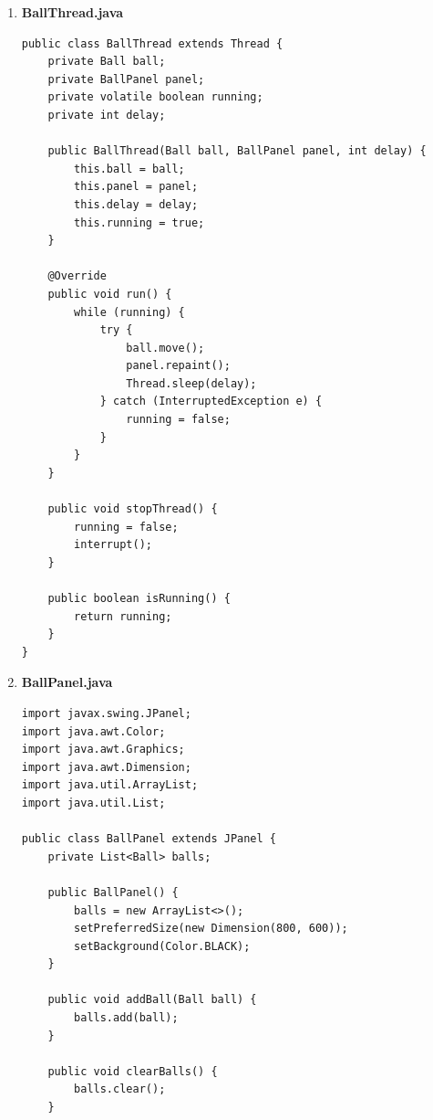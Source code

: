 \documentclass[a4paper]{article}
\begin{document}
\begin{enumerate}[itemsep=1em]
\begin{enumerate}[itemsep=1em]
\begin{verbatim}
        if (y - radius < 0 || y + radius > panelHeight) {
            dy = -dy;
            if (y - radius < 0) y = radius;
            if (y + radius > panelHeight) 
                y = panelHeight - radius;
        }
    }

    public void draw(Graphics g) {
        g.setColor(color);
        g.fillOval((int)(x - radius), (int)(y - radius), 
                   radius * 2, radius * 2);
    }

    public void updatePanelSize(int w, int h) {
        this.panelWidth = w;
        this.panelHeight = h;
    }
}
    \end{verbatim}
    \item \textbf{BallThread.java}
    \begin{verbatim}
public class BallThread extends Thread {
    private Ball ball;
    private BallPanel panel;
    private volatile boolean running;
    private int delay;

    public BallThread(Ball ball, BallPanel panel, int delay) {
        this.ball = ball;
        this.panel = panel;
        this.delay = delay;
        this.running = true;
    }

    @Override
    public void run() {
        while (running) {
            try {
                ball.move();
                panel.repaint();
                Thread.sleep(delay);
            } catch (InterruptedException e) {
                running = false;
            }
        }
    }

    public void stopThread() {
        running = false;
        interrupt();
    }

    public boolean isRunning() {
        return running;
    }
}
    \end{verbatim}
    \item \textbf{BallPanel.java}
    \begin{verbatim}
import javax.swing.JPanel;
import java.awt.Color;
import java.awt.Graphics;
import java.awt.Dimension;
import java.util.ArrayList;
import java.util.List;

public class BallPanel extends JPanel {
    private List<Ball> balls;

    public BallPanel() {
        balls = new ArrayList<>();
        setPreferredSize(new Dimension(800, 600));
        setBackground(Color.BLACK);
    }

    public void addBall(Ball ball) {
        balls.add(ball);
    }

    public void clearBalls() {
        balls.clear();
    }


\end{verbatim}
\end{enumerate}
\end{enumerate}
\end{document}
